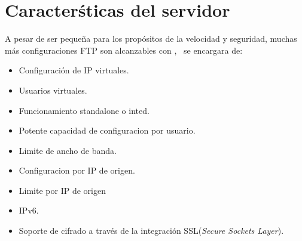 \section{Caracter\'sticas del servidor}
  A pesar de ser peque\~na para los prop\'ositos de la velocidad y seguridad, muchas m\'as 
  configuraciones FTP son alcanzables con \vsftpd, \vsftpd\ se encargara de:
  \begin{itemize}
    \item Configuración de IP virtuales.
    \item Usuarios virtuales.
    \item Funcionamiento standalone o inted.
    \item Potente capacidad de configuracion por usuario.
    \item Limite de ancho de banda.
    \item Configuracion por IP de origen.
    \item Limite por IP de origen
    \item IPv6.
    \item Soporte de cifrado a través de la integración SSL({\em Secure Sockets Layer}).
  \end{itemize}
  

